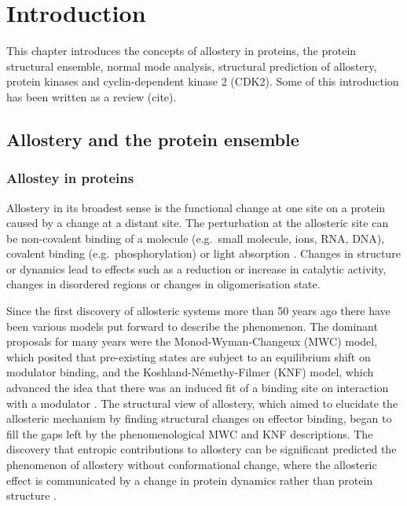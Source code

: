\chapter{Introduction}
\label{cha:introduction}

This chapter introduces the concepts of allostery in proteins, the protein structural ensemble, normal mode analysis, structural prediction of allostery, protein kinases and cyclin-dependent kinase 2 (CDK2).
Some of this introduction has been written as a review (cite).


\section{Allostery and the protein ensemble}

\subsection{Allostey in proteins}

Allostery in its broadest sense is the functional change at one site on a protein caused by a change at a distant site.
The perturbation at the allosteric site can be non-covalent binding of a molecule (e.g.\ small molecule, ions, RNA, DNA), covalent binding (e.g.\ phosphorylation) or light absorption \cite{Nussinov2013}.
Changes in structure or dynamics lead to effects such as a reduction or increase in catalytic activity, changes in disordered regions or changes in oligomerisation state.

Since the first discovery of allosteric systems more than 50 years ago there have been various models put forward to describe the phenomenon.
The dominant proposals for many years were the Monod-Wyman-Changeux (MWC) model, which posited that pre-existing states are subject to an equilibrium shift on modulator binding, and the Koshland-N\'{e}methy-Filmer (KNF) model, which advanced the idea that there was an induced fit of a binding site on interaction with a modulator \cite{Motlagh2014}.
The structural view of allostery, which aimed to elucidate the allosteric mechanism by finding structural changes on effector binding, began to fill the gaps left by the phenomenological MWC and KNF descriptions.
The discovery that entropic contributions to allostery can be significant predicted the phenomenon of allostery without conformational change, where the allosteric effect is communicated by a change in protein dynamics rather than protein structure \cite{Motlagh2014}.

